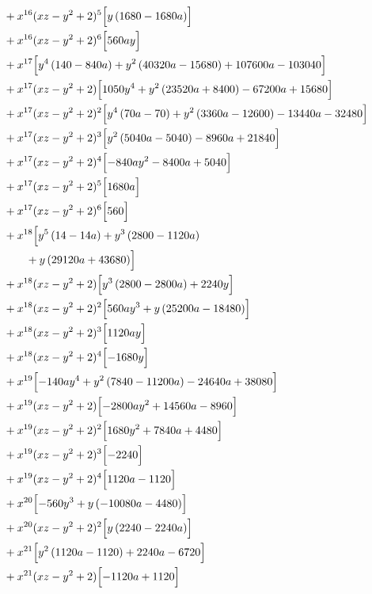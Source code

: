\begin{align*}
&{}+x^{16}(xz-y^2+2)^{5}\Bigl[y \left(1680 - 1680 a\right)\Bigr]\\
&{}+x^{16}(xz-y^2+2)^{6}\Bigl[560 a y\Bigr]\\
&{}+x^{17}\Bigl[y^{4} \left(140 - 840 a\right) + y^{2} \left(40320 a - 15680\right) + 107600 a - 103040\Bigr]\\
&{}+x^{17}(xz-y^2+2)\Bigl[1050 y^{4} + y^{2} \left(23520 a + 8400\right) - 67200 a + 15680\Bigr]\\
&{}+x^{17}(xz-y^2+2)^{2}\Bigl[y^{4} \left(70 a - 70\right) + y^{2} \left(3360 a - 12600\right) - 13440 a - 32480\Bigr]\\
&{}+x^{17}(xz-y^2+2)^{3}\Bigl[y^{2} \left(5040 a - 5040\right) - 8960 a + 21840\Bigr]\\
&{}+x^{17}(xz-y^2+2)^{4}\Bigl[- 840 a y^{2} - 8400 a + 5040\Bigr]\\
&{}+x^{17}(xz-y^2+2)^{5}\Bigl[1680 a\Bigr]\\
&{}+x^{17}(xz-y^2+2)^{6}\Bigl[560\Bigr]\\
&{}+x^{18}\Bigl[y^{5} \left(14 - 14 a\right) + y^{3} \left(2800 - 1120 a\right)\\
&\qquad + y \left(29120 a + 43680\right)\Bigr]\\
&{}+x^{18}(xz-y^2+2)\Bigl[y^{3} \left(2800 - 2800 a\right) + 2240 y\Bigr]\\
&{}+x^{18}(xz-y^2+2)^{2}\Bigl[560 a y^{3} + y \left(25200 a - 18480\right)\Bigr]\\
&{}+x^{18}(xz-y^2+2)^{3}\Bigl[1120 a y\Bigr]\\
&{}+x^{18}(xz-y^2+2)^{4}\Bigl[- 1680 y\Bigr]\\
&{}+x^{19}\Bigl[- 140 a y^{4} + y^{2} \left(7840 - 11200 a\right) - 24640 a + 38080\Bigr]\\
&{}+x^{19}(xz-y^2+2)\Bigl[- 2800 a y^{2} + 14560 a - 8960\Bigr]\\
&{}+x^{19}(xz-y^2+2)^{2}\Bigl[1680 y^{2} + 7840 a + 4480\Bigr]\\
&{}+x^{19}(xz-y^2+2)^{3}\Bigl[- 2240\Bigr]\\
&{}+x^{19}(xz-y^2+2)^{4}\Bigl[1120 a - 1120\Bigr]\\
&{}+x^{20}\Bigl[- 560 y^{3} + y \left(- 10080 a - 4480\right)\Bigr]\\
&{}+x^{20}(xz-y^2+2)^{2}\Bigl[y \left(2240 - 2240 a\right)\Bigr]\\
&{}+x^{21}\Bigl[y^{2} \left(1120 a - 1120\right) + 2240 a - 6720\Bigr]\\
&{}+x^{21}(xz-y^2+2)\Bigl[- 1120 a + 1120\Bigr]\\

\end{align*}
